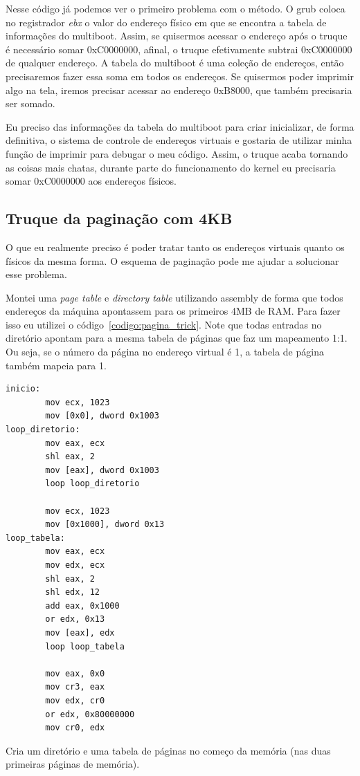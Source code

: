 \documentclass{article}
\begin{document}
Nesse código já podemos ver o primeiro problema com o método. O grub coloca no
registrador \emph{ebx} o valor do endereço físico em que se encontra a tabela de
informações do multiboot. Assim, se quisermos acessar o endereço após o truque é
necessário somar 0xC0000000, afinal, o truque efetivamente subtrai 0xC0000000 de
qualquer endereço. A tabela do multiboot é uma coleção de endereços, então
precisaremos fazer essa soma em todos os endereços. Se quisermos poder imprimir
algo na tela, iremos precisar acessar ao endereço 0xB8000, que também
precisaria ser somado.

Eu preciso das informações da tabela do multiboot para criar inicializar, de
forma definitiva, o sistema de controle de endereços virtuais e gostaria
de utilizar minha função de imprimir para debugar o meu código. Assim, o truque
acaba tornando as coisas mais chatas, durante parte do funcionamento do kernel
eu precisaria somar 0xC0000000 aos endereços físicos.

\subsection{Truque da paginação com 4KB}
O que eu realmente preciso é poder tratar tanto os endereços virtuais quanto os
físicos da mesma forma. O esquema de paginação pode me ajudar a solucionar esse
problema.

Montei uma \emph{page table} e \emph{directory table} utilizando assembly
de forma que todos endereços da máquina apontassem para os primeiros 4MB de RAM.
Para fazer isso eu utilizei o código~\ref{codigo:pagina_trick}. Note que todas
entradas no diretório apontam para a mesma tabela de páginas que faz um
mapeamento 1:1. Ou seja, se o número da página no endereço virtual é 1, a tabela
de página também mapeia para 1.

\begin{codigo}
\begin{verbatim}
inicio:
        mov ecx, 1023
        mov [0x0], dword 0x1003
loop_diretorio:
        mov eax, ecx
        shl eax, 2
        mov [eax], dword 0x1003
        loop loop_diretorio

        mov ecx, 1023
        mov [0x1000], dword 0x13
loop_tabela:
        mov eax, ecx
        mov edx, ecx
        shl eax, 2
        shl edx, 12
        add eax, 0x1000
        or edx, 0x13
        mov [eax], edx
        loop loop_tabela

        mov eax, 0x0
        mov cr3, eax
        mov edx, cr0
        or edx, 0x80000000
        mov cr0, edx
\end{verbatim}
\caption{Cria um diretório e uma tabela de páginas no começo da
memória (nas duas primeiras páginas de memória).}
\label{codigo:pagina_trick}
\end{codigo}
\end{document}
